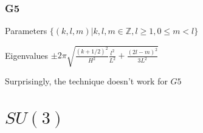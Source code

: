 \documentclass{beamer}
\def\Z{{\mathbb Z}}
\begin{document}
\begin{frame}
	\frametitle{G5}
	\begin{block}{Parameters}
		$\{(k,l,m)| k,l,m \in \Z, l \geq 1, 0 \leq m < l\}$
	\end{block}

	\begin{block}{Eigenvalues}
		$\pm 2\pi\sqrt{\frac{(k+1/2)^2}{H^2}\frac{l^2}{L^2} + \frac{(2l- m)^2}{3L^2}}$
	\end{block}

	\pause

	\begin{block}{}
		Surprisingly, the technique doesn't work for $G5$
	\end{block}
\end{frame}

\section{$SU(3)$}
\end{document}

